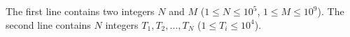 The first line contains two integers $N$ and $M$ ($1 \le N \le 10^5$, $1 \le M \le 10^9$).
The second line contains $N$ integers $T_1, T_2, \dots, T_N$ ($1 \le T_i \le 10^4$).